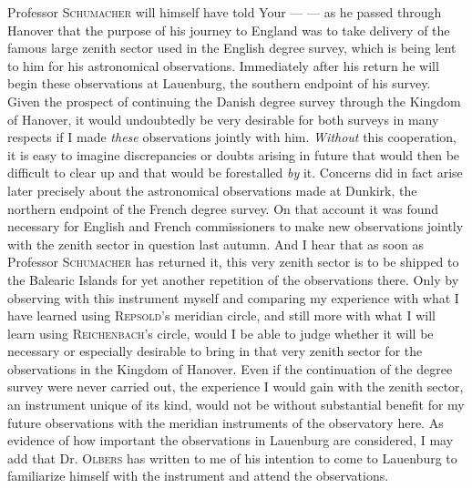 Professor \textsc{Schumacher} will himself have told Your — — as he passed through Hanover that the purpose of his journey to England was to take delivery of the famous large zenith sector used in the English degree survey, which is being lent to him for his astronomical observations. Immediately after his return he will begin these observations at Lauenburg, the southern endpoint of his survey. Given the prospect of continuing the Danish degree survey through the Kingdom of Hanover, it would undoubtedly be very desirable for both surveys in many respects if I made \textit{these} observations jointly with him. \textit{Without} this cooperation, it is easy to imagine discrepancies or doubts arising in future that would then be difficult to clear up and that would be forestalled \textit{by} it. Concerns did in fact arise later precisely about the astronomical observations made at Dunkirk, the northern endpoint of the French degree survey. On that account it was found necessary for English and French commissioners to make new observations jointly with the zenith sector in question last autumn. And I hear that as soon as Professor \textsc{Schumacher} has returned it, this very zenith sector is to be shipped to the Balearic Islands for yet another repetition of the observations there. Only by observing with this instrument myself and comparing my experience with what I have learned using \textsc{Repsold}’s meridian circle, and still more with what I will learn using \textsc{Reichenbach}’s circle, would I be able to judge whether it will be necessary or especially desirable to bring in that very zenith sector for the observations in the Kingdom of Hanover. Even if the continuation of the degree survey were never carried out, the experience I would gain with the zenith sector, an instrument unique of its kind, would not be without substantial benefit for my future observations with the meridian instruments of the observatory here. As evidence of how important the observations in Lauenburg are considered, I may add that Dr. \textsc{Olbers} has written to me of his intention to come to Lauenburg to familiarize himself with the instrument and attend the observations.
